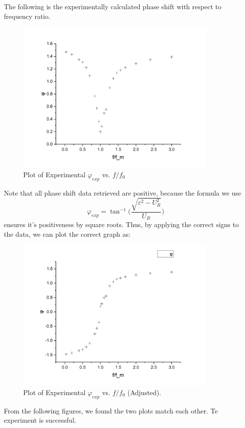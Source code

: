 \documentclass[a4paper]{article}
\begin{document}
The following is the experimentally calculated phase shift with respect to frequency ratio.

\begin{figure}[H]
	\center
	\includegraphics[width=10cm]{phase_e.jpg}
	\caption{Plot of Experimental $\varphi_{exp}$ vs. $f/f_0$}
\end{figure}

Note that all phase shift data retrieved are positive, because the formula we use
$$\varphi_{exp} = \tan^{-1}\bigg(\frac{\sqrt{\varepsilon^2-U_R^2}}{U_R}\bigg)$$
ensures it's positiveness by square roots. Thus, by applying the correct signs to the data, we can plot the correct graph as:

\begin{figure}[H]
	\center
	\includegraphics[width=10cm]{phase_e_ad.jpg}
	\caption{Plot of Experimental $\varphi_{exp}$ vs. $f/f_0$ (Adjusted).}
\end{figure}


From the following figures, we found the two plots match each other. Te experiment is successful.
\end{document}
